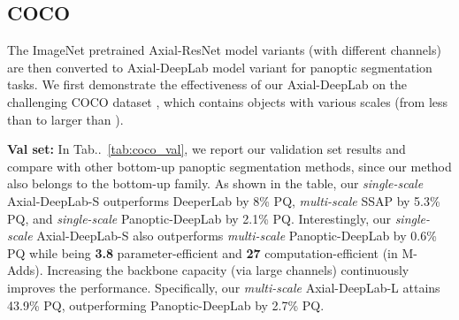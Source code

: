 \documentclass[runningheads]{llncs}
\makeatletter
\DeclareRobustCommand\onedot{\futurelet\@let@token\@onedot}
\def\@onedot{\ifx\@let@token.\else.\null\fi\xspace}
\newcommand{\tabref}[1]{Tab\onedot~\ref{#1}}
\makeatother
\begin{document}
\subsection{COCO}

The ImageNet pretrained Axial-ResNet model variants (with different channels) are then converted to Axial-DeepLab model variant for panoptic segmentation tasks. We first demonstrate the effectiveness of our Axial-DeepLab on the challenging COCO dataset \cite{lin2014microsoft}, which contains objects with various scales (from less than  to larger than ).

{\bf Val set:} In \tabref{tab:coco_val}, we report our validation set results and compare with other bottom-up panoptic segmentation methods, since our method also belongs to the bottom-up family. As shown in the table, our {\it single-scale} Axial-DeepLab-S outperforms DeeperLab \cite{yang2019deeperlab} by 8\% PQ, {\it multi-scale} SSAP \cite{gao2019ssap} by 5.3\% PQ, and {\it single-scale} Panoptic-DeepLab by 2.1\% PQ. Interestingly, our {\it single-scale} Axial-DeepLab-S also outperforms {\it multi-scale} Panoptic-DeepLab by 0.6\% PQ while being {\bf 3.8} parameter-efficient and {\bf 27} computation-efficient (in M-Adds). Increasing the backbone capacity (via large channels) continuously improves the performance. Specifically, our {\it multi-scale} Axial-DeepLab-L attains 43.9\% PQ, outperforming Panoptic-DeepLab \cite{cheng2019panoptic} by 2.7\% PQ.

    \begin{table}[!t]
    \caption{COCO val set. {\bf MS:} Multi-scale inputs}
    \label{tab:coco_val}
    \setlength{\tabcolsep}{0.31em}
        \centering
    \end{table}
\end{document}

